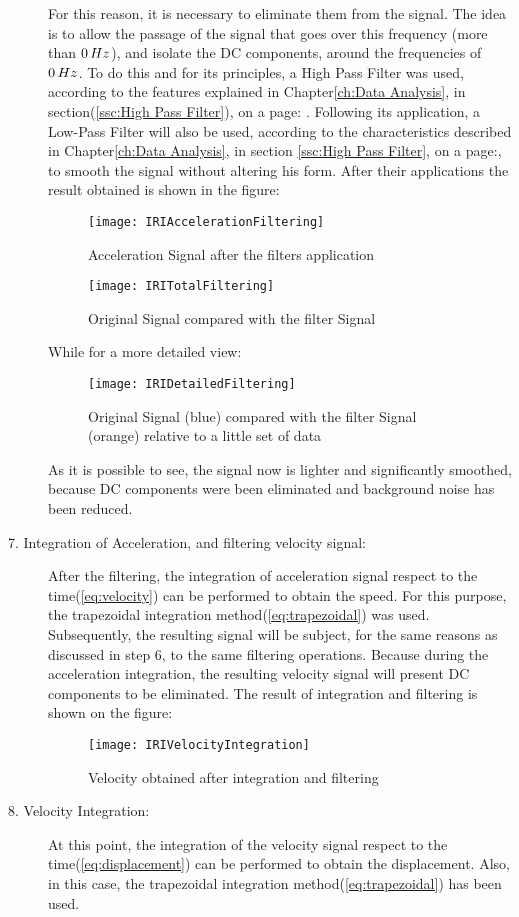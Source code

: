 \documentclass[tesi]{subfiles}
\begin{document}
\begin{description}
For this reason, it is necessary to eliminate them from the signal. The idea is to allow the passage of the signal that goes over this frequency (more than $0 \thinspace Hz$), and isolate the DC components, around the frequencies of $0 \thinspace Hz$. To do this and for its principles, a High Pass Filter was used, according to the features explained in Chapter\ref{ch:Data Analysis}, in section(\ref{ssc:High Pass Filter}), on a page: \pageref{ssc:High Pass Filter}.
Following its application, a Low-Pass Filter will also be used, according to the characteristics described in Chapter\ref{ch:Data Analysis}, in section \ref{ssc:High Pass Filter}, on a page:\pageref{ssc:Low Pass Filter}, to smooth the signal without altering his form.
After their applications the result obtained is shown in the figure:
\begin{figure}[H]
\centering
\texttt{[image: IRIAccelerationFiltering]}
\caption{Acceleration Signal after the filters application}
\end{figure}

\begin{figure}[H]
\centering
\texttt{[image: IRITotalFiltering]}
\caption{Original Signal compared with the filter Signal}
\end{figure}
While for a more detailed view:
\begin{figure}[H]
\centering
\texttt{[image: IRIDetailedFiltering]}
\caption{Original Signal (blue) compared with the filter Signal (orange) relative to a little set of data}
\end{figure}
As it is possible to see, the signal now is lighter and significantly smoothed, because DC components were been eliminated and background noise has been reduced.
\item[7. Integration of Acceleration, and filtering velocity signal:] After the filtering, the integration of acceleration signal respect to the time(\ref{eq:velocity}) can be performed to obtain the speed. For this purpose, the trapezoidal integration method(\ref{eq:trapezoidal}) was used. Subsequently, the resulting signal will be subject, for the same reasons as discussed in step 6, to the same filtering operations. Because during the acceleration integration, the resulting velocity signal will present DC components to be eliminated.
The result of integration and filtering is shown on the figure:
\begin{figure}[H]
\centering
\texttt{[image: IRIVelocityIntegration]}
\caption{Velocity obtained after integration and filtering}
\end{figure}
\item[8. Velocity Integration:]
At this point, the integration of the velocity signal respect to the time(\ref{eq:displacement}) can be performed to obtain the displacement. Also, in this case, the trapezoidal integration method(\ref{eq:trapezoidal}) has been used.


\end{description}
\end{document}
